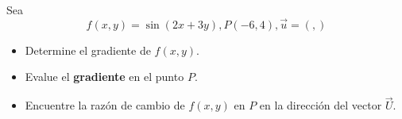 \documentclass[12pt]{article}
\begin{document}
Sea $$f(x, y) = \sin{(2x + 3y)}, P(−6, 4), \vec{u}=\left(,\right)$$

\begin{itemize}[format=\textbf]

\item Determine el gradiente de $f(x, y)$.

\item Evalue el \textbf{gradiente} en el punto $P$.

\item Encuentre la razón de cambio de $f(x, y)$ en $P$ en la dirección del vector $\vec{U}$.

\end{itemize}
\end{document}
